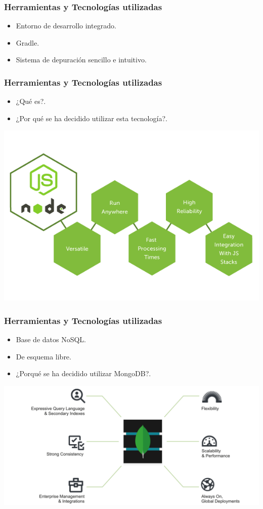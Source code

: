 \begin{frame}
	\frametitle{Herramientas y Tecnologías utilizadas}
		\begin{itemize}
			\item Entorno de desarrollo integrado.
			\item Gradle.
			\item Sistema de depuración sencillo e intuitivo.
		\end{itemize}
	\endblock{}
\end{frame}


\begin{frame}
	\frametitle{Herramientas y Tecnologías utilizadas}
			\begin{itemize}
				\item {¿Qué es?}.
				\item {¿Por qué se ha decidido utilizar esta tecnología?}.
			\end{itemize}
		\endblock{}
			\begin{center}
				\includegraphics[width=0.72\linewidth]{Images/nodejsfunc}
			\end{center}
\end{frame}

\begin{frame}
	\frametitle{Herramientas y Tecnologías utilizadas}
			\begin{itemize}
				\item {Base de datos NoSQL}.
				\item {De esquema libre}.
				\item {¿Porqué se ha decidido utilizar MongoDB?}.
			\end{itemize}
		\endblock{}
		\vfill 
		\begin{center}
			\includegraphics[width=0.88\linewidth]{Images/mongodb-architecture}
		\end{center}
\end{frame}

